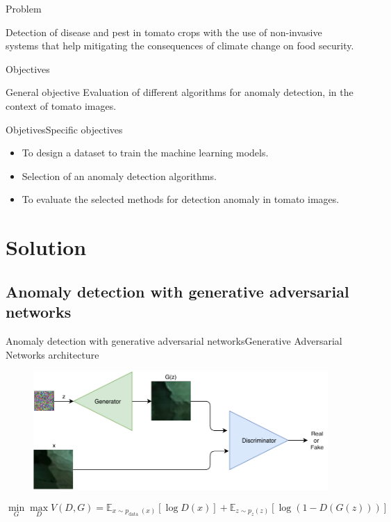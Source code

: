 \documentclass[15pt]{beamer} %
\begin{document}
\begin{frame}{Problem}
  
Detection of disease and pest in tomato crops with the use of non-invasive systems that help mitigating the consequences of climate change on food security.
\end{frame}

\begin{frame}{Objectives}
 \begin{block}{General objective}
 Evaluation of different algorithms for anomaly
detection, in the context of tomato images.
 \end{block}
\end{frame}


\begin{frame}{Objetives}{\tiny{Specific objectives}}
  
  \begin{itemize}
  \item To design a dataset to train the machine learning models.
  \item Selection of an anomaly detection algorithms.
  \item To evaluate the selected methods for detection anomaly in tomato images.
  \end{itemize}
\end{frame}


\section{Solution}

\subsection{Anomaly detection with generative adversarial networks}


\begin{frame}{Anomaly detection with generative adversarial networks}{\tiny{Generative Adversarial Networks architecture}}
  \begin{figure}
   \centering
   \includegraphics[width=\textwidth]{gan}
  \end{figure}
  
  \begin{equation}
  \nonumber
 \min _{G} \max _{D} V(D, G)=\mathbb{E}_{x \sim p_{\text {data }}(x)}[\log D(x)]+\mathbb{E}_{z \sim p_{z}(z)}[\log (1-D(G(z)))]
\end{equation}
\end{frame}
\end{document}
